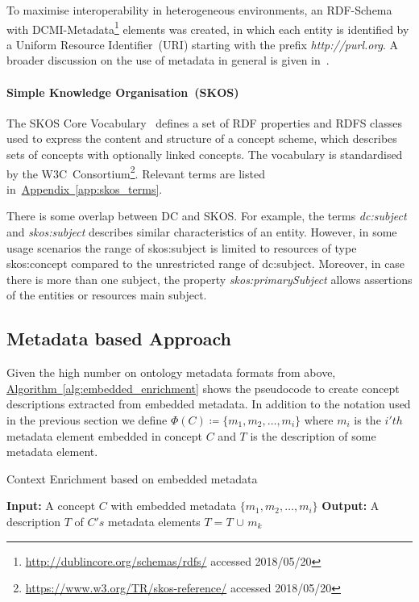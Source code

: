 To maximise interoperability in heterogeneous environments, an RDF-Schema with DCMI-Metadata\footnote{\url{http://dublincore.org/schemas/rdfs/} accessed 2018/05/20} elements was created, in which each entity is identified by a Uniform Resource Identifier~(URI) starting with the prefix \emph{http://purl.org}. A broader discussion on the use of metadata in general is given in~\cite{nilsson2010}.  

\paragraph{Simple Knowledge Organisation~(SKOS)}
The SKOS Core Vocabulary~\cite{skos2005} defines a set of RDF properties and RDFS classes
used to express the content and structure of a concept scheme, which describes sets of concepts with optionally linked concepts. The vocabulary is standardised by the W3C~Consortium\footnote{\url{https://www.w3.org/TR/skos-reference/} accessed 2018/05/20}. Relevant terms are listed in~\hyperref[app:skos_terms]{Appendix~\ref*{app:skos_terms}}.
	
There is some overlap between DC and SKOS. For example, the terms \textit{dc:subject} and \textit{skos:subject} describes similar characteristics of an entity. However, in some usage scenarios the range of skos:subject is limited to resources of type skos:concept compared to the unrestricted range of dc:subject. Moreover, in case there is more than one subject, the property \textit{skos:primarySubject} allows assertions of the entities or resources main subject. 


\subsection{Metadata based Approach}\label{sec:enrichment_metaData_approach}
Given the high number on ontology metadata formats from above, \hyperref[alg:embedded_enrichment]{Algorithm~\ref*{alg:embedded_enrichment}} shows the pseudocode to create concept descriptions extracted from embedded metadata. In addition to the notation used in the previous section we define $\Phi(C) \coloneqq \{m_1, m_2, \ldots, m_i \}$ where $m_i$ is the $i'th$ metadata element embedded in concept $C$ and $T$ is the description of some metadata element.

\begin{algorithm}
	\caption{Context Enrichment based on embedded metadata}\label{alg:embedded_enrichment}
	\begin{algorithmic}[1]
		\newline
			\textbf{Input:} A concept $C$ with embedded metadata $\{m_1, m_2, \ldots, m_i \}$\newline
			\textbf{Output:} A description $T$ of $C's$ metadata elements\newline
				\State $T=T$ $\cup$ $m_k$
			\EndFor
		\EndProcedure
	\end{algorithmic}
\end{algorithm}

